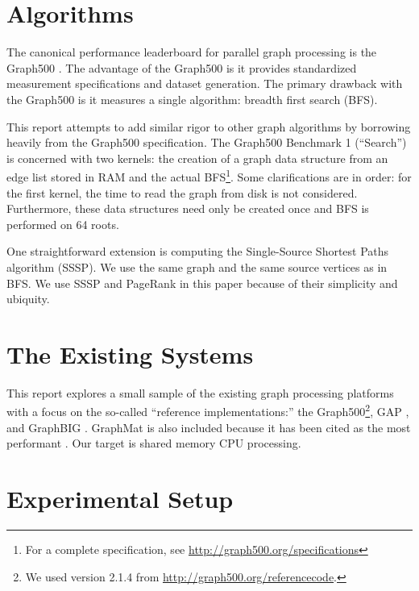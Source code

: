 \documentclass[conference]{IEEEtran}
\begin{document}
\section{Algorithms}

The canonical performance leaderboard for parallel graph processing is the Graph500 \cite{Murphy:2010:Graph500}. The advantage of the Graph500 is it provides standardized measurement specifications and dataset generation. The primary drawback with the Graph500 is it measures a single algorithm: breadth first search (BFS).

This report attempts to add similar rigor to other graph algorithms by borrowing heavily from the Graph500 specification. The Graph500 Benchmark 1 (``Search'') is concerned with two kernels: the creation of a graph data structure from an edge list stored in RAM and the actual BFS\footnote{For a complete specification, see \url{http://graph500.org/specifications}}. Some clarifications are in order: for the first kernel, the time to read the graph from disk is not considered. Furthermore, these data structures need only be created once and BFS is performed on 64 roots.

One straightforward extension is computing the Single-Source Shortest Paths algorithm (SSSP). We use the same graph and the same source vertices as in BFS. We use SSSP and PageRank in this paper because of their simplicity and ubiquity.

\section{The Existing Systems}
This report explores a small sample of the existing graph processing platforms with a focus on the so-called ``reference implementations:'' the Graph500\footnote{We used version 2.1.4 from \url{http://graph500.org/referencecode}.}, GAP \cite{Beamer:2015:GAPBench}, and GraphBIG \cite{Nai:2015:Graphbig}. GraphMat is also included because it has been cited as the most performant \cite{Sundaram:2015:GraphMat}. Our target is shared memory CPU processing.


\section{Experimental Setup}
\end{document}
